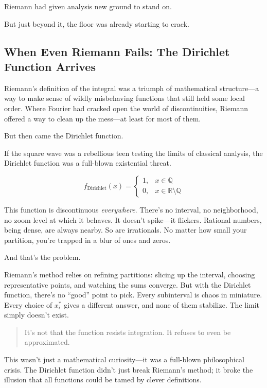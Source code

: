 Riemann had given analysis new ground to stand on.

But just beyond it, the floor was already starting to crack.


\subsection{When Even Riemann Fails: The Dirichlet Function Arrives}

Riemann’s definition of the integral was a triumph of mathematical structure—a way to make sense of wildly misbehaving functions that still held some local order. Where Fourier had cracked open the world of discontinuities, Riemann offered a way to clean up the mess—at least for most of them.

But then came the Dirichlet function.

If the square wave was a rebellious teen testing the limits of classical analysis, the Dirichlet function was a full-blown existential threat.

\[
f_{\text{Dirichlet}}(x) =
\begin{cases}
1, & x \in \mathbb{Q} \\
0, & x \in \mathbb{R} \setminus \mathbb{Q}
\end{cases}
\]

This function is discontinuous \emph{everywhere}. There’s no interval, no neighborhood, no zoom level at which it behaves. It doesn’t spike—it flickers. Rational numbers, being dense, are always nearby. So are irrationals. No matter how small your partition, you’re trapped in a blur of ones and zeros.

And that’s the problem.

Riemann’s method relies on refining partitions: slicing up the interval, choosing representative points, and watching the sums converge. But with the Dirichlet function, there’s no “good” point to pick. Every subinterval is chaos in miniature. Every choice of \(x_i^*\) gives a different answer, and none of them stabilize. The limit simply doesn’t exist.

\begin{quote}
It’s not that the function resists integration.  
It refuses to even be approximated.
\end{quote}

This wasn’t just a mathematical curiosity—it was a full-blown philosophical crisis. The Dirichlet function didn’t just break Riemann’s method; it broke the illusion that all functions could be tamed by clever definitions.

